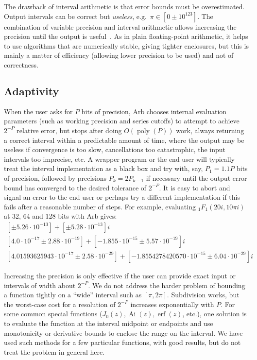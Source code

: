 \documentclass[review,nohypdvips]{siamart0216}
\begin{document}
The drawback of interval arithmetic
is that error bounds must be overestimated.
Output intervals can be correct but
\emph{useless}, e.g.\ $\pi \in [0 \pm 10^{123}]$.
The combination of variable precision and interval arithmetic
allows increasing the precision until the output is useful~\cite{RevolRouillier2005}.
As in plain floating-point arithmetic, it helps to use algorithms
that are numerically stable, giving tighter enclosures,
but this is mainly a matter of efficiency (allowing lower precision to be used) and not of correctness.

\subsection{Adaptivity}

When the user asks for $P$ bits of precision,
Arb chooses internal evaluation parameters
(such as working precision and series cutoffs) to attempt to achieve $2^{-P}$
relative error, but stops
after doing $O(\operatorname{poly}(P))$ work, always returning a correct
interval within a predictable amount of time, where the output
may be useless if convergence is too slow,
cancellations too catastrophic, the input intervals too imprecise, etc.
A wrapper program or the end user will typically treat the
interval implementation as a black box and try
with, say, $P_1 = 1.1 P$ bits of precision, followed by precisions
$P_k = 2P_{k-1}$ if necessary until the output error bound has converged to
the desired tolerance of $2^{-P}$.
It is easy to abort and signal an error to the end user or
perhaps try a different implementation if
this fails after a reasonable number of steps.
For example, evaluating ${}_1F_1(20i, 10\pi i)$ at 32, 64 and 128 bits with Arb gives:
\begin{equation*}
\begin{array}{c}
{}[\pm 5.26 \cdot 10^{-13}] + [\pm 5.28 \cdot 10^{-13}]i \\
{}[4.0 \cdot 10^{-17} \pm 2.88 \cdot 10^{-19}] + [-1.855 \cdot 10^{-15} \pm 5.57 \cdot 10^{-19}]i \\
{}[4.01593625943 \cdot 10^{-17} \pm 2.58 \cdot 10^{-29}] + [-1.8554278420570 \cdot 10^{-15} \pm 6.04 \cdot 10^{-29}]i
\end{array}
\end{equation*}

Increasing the precision is only effective if the user can
provide exact input or intervals of width about $2^{-P}$.
We do not address the harder problem of bounding a function tightly
on a ``wide'' interval such as $[\pi,2\pi]$. Subdivision works,
but the worst-case cost for a resolution of $2^{-P}$ increases exponentially with $P$.
For some common special functions
($J_0(z), \operatorname{Ai}(z), \operatorname{erf}(z)$, etc.),
one solution is to evaluate the
function at the interval midpoint or endpoints and use
monotonicity or derivative bounds to enclose
the range on the interval.
We have used such methods for a few particular functions,
with good results, but do not treat the problem in general here.
\end{document}
